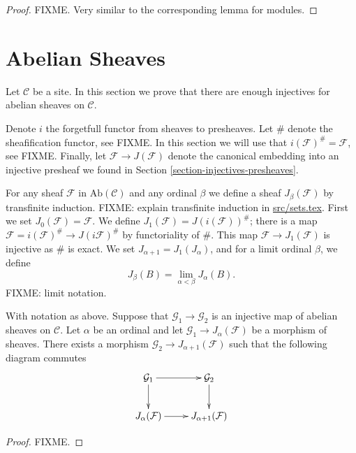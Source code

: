 \begin{proof}
FIXME. Very similar to the corresponding lemma for modules.
\end{proof}

\section{Abelian Sheaves}
\label{section-injectives-sheaves}

\noindent
Let $\mathcal{C}$ be a site. In this section we prove that there are 
enough injectives for abelian sheaves on $\mathcal{C}$. 

\medskip\noindent
Denote $i$ the forgetfull functor from sheaves to presheaves. Let
$\#$ denote the sheafification functor, see FIXME. In this section we
will use that $i(\mathcal{F})^\# = \mathcal{F}$, see FIXME.
Finally, let $\mathcal{F} \to J(\mathcal{F})$ denote the canonical
embedding into an injective presheaf we found in 
Section \ref{section-injectives-presheaves}. 

\medskip\noindent
For any sheaf $\mathcal{F}$ in $\text{Ab}(\mathcal{C})$ and
any ordinal $\beta$ we define a sheaf
$J_\beta(\mathcal{F})$ by transfinite induction.
FIXME: explain transfinite induction in \url{src/sets.tex}.
First we set $J_0(\mathcal{F})=\mathcal{F}$.
We define $J_1(\mathcal{F})=J(i(\mathcal{F}))^\#$;
there is a map $\mathcal{F}=i(\mathcal{F})^\# \to J(i\mathcal{F})^\#$
by functoriality of $\#$. This map $\mathcal{F} \to J_1(\mathcal{F})$
is injective as $\#$ is exact. We set $J_{\alpha+1}=J_1(J_\alpha)$, 
and for a limit ordinal $\beta$, we define
$$
J_\beta(B) = \lim_{\alpha < \beta} J_\alpha(B).
$$
FIXME: limit notation.

\begin{lemma}
\label{lemma-map-into-next-one}
With notation as above.
Suppose that $\mathcal{G}_1 \to \mathcal{G}_2$ is an injective
map of abelian sheaves on $\mathcal{C}$. Let $\alpha$ be an ordinal
and let $\mathcal{G}_1\to J_\alpha(\mathcal{F})$ be a morphism
of sheaves. There exists a morphism $\mathcal{G}_2 \to
J_{\alpha+1}(\mathcal{F})$ such that the following diagram commutes
$$
\xymatrix{
\mathcal{G}_1 \ar[d] \ar[r] & \mathcal{G}_2 \ar[d] \\
J_{\alpha}(\mathcal{F}) \ar[r] & J_{\alpha+1}(\mathcal{F}) }
$$
\end{lemma}

\begin{proof}
FIXME.
\end{proof}

